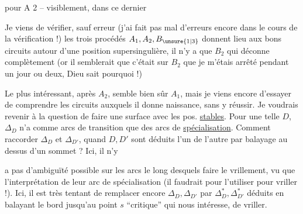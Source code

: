  pour A 2 -- visiblement, dans ce dernier

Je viens de vérifier, sauf erreur (j'ai fait pas mal d'erreurs encore dans le cours de la vérification !) les trois procédés $A_1,A_2,B_{\unsure{1|3}}$ donnent lieu aux bons circuits autour d'une position supersingulière, il n'y a que $B_2$ qui déconne complètement (or il semblerait que c'était sur $B_2$ que je m'étais arrêté pendant un jour ou deux, Dieu sait pourquoi !)

Le plus intéressant, après $A_2$, semble bien sûr $A_1$, mais je viens encore d'essayer de comprendre les circuits auxquels il donne naissance, sans y réussir.
Je voudrais revenir à la question de faire une surface avec les pos. \uline{stables}. Pour une telle $D$, $\Delta_D$ n'a comme arcs de transition que des arcs de \uline{spécialisation}. Comment raccorder $\Delta_D$ et $\Delta_{D'}$, quand $D,D'$ sont déduits l'un de l'autre par balayage au dessus d'un sommet ? Ici, il n'y


a pas d'ambiguïté possible sur les arcs le long desquels faire le vrillement, vu que l'interprétation de leur arc de spécialisation  (il faudrait  pour l'utiliser pour vriller !).  Ici, il est très tentant de remplacer encore $\Delta_D,\Delta_{D'}$ par $\Delta_D^*,\Delta_{D'}^*$ déduits en balayant le bord jusqu'au point $s$ ``critique'' qui nous intéresse,  de vriller.


